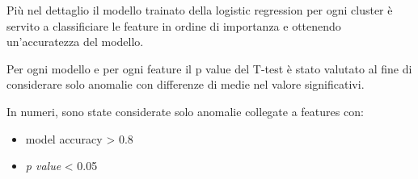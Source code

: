Più nel dettaglio il modello trainato della logistic regression per ogni cluster è servito a classificiare le feature in ordine di importanza e ottenendo un'accuratezza del modello.

Per ogni modello e per ogni feature il p value del T-test è stato valutato al fine di considerare solo anomalie con differenze di medie nel valore significativi.

In numeri, sono state considerate solo anomalie collegate a features con:
\begin{itemize}
\item model accuracy > 0.8
\item \textit{p value} < 0.05
\end{itemize}

